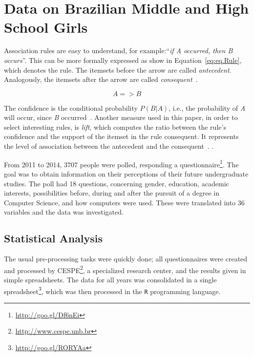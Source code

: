 \section{Data on Brazilian Middle and High School Girls}\label{sec:mining}%
Association rules are easy to understand, for example:``\emph{if A occurred, then B occurs}''. This can be more formally expressed as show in Equation~\ref{eq:eq.Rule}, which denotes the rule. The itemsets before the arrow are called \emph{antecedent}. Analogously, the itemsets after the arrow are called \emph{consequent}~\cite{Hastie2009}.

\begin{equation}
{A} => {B}
\label{eq:eq.Rule}%
\end{equation}

The confidence is the conditional probability $P(B|A)$, i.e., the probability of \emph{A} will occur, since \emph{B} occurred~\cite{Hastie2009}. Another measure used in this paper, in order to select interesting rules, is \emph{lift}, which computes the ratio between the rule's confidence and the support of the itemset in the rule consequent. It represents the level of association between the antecedent and the consequent~\cite{tan2006introduction}. .

From 2011 to 2014, 3707 people were polled, responding a questionnaire\footnote{\url{http://goo.gl/Df6nEi}}. The goal was to obtain information on their perceptions of their future undergraduate studies. The poll had 18 questions, concerning gender, education, academic interests, possibilities before, during and after the pursuit of a degree in Computer Science, and how computers were used. These were translated into 36 variables and the data was investigated.

\subsection{Statistical Analysis}\label{sec:mining:stat}%
The usual pre-processing tasks were quickly done; all questionnaires were created and processed by CESPE\footnote{\url{http://www.cespe.unb.br}}, a specialized research center, and the results given in simple spreadsheets. The data for all years was consolidated in a single spreadsheet\footnote{\url{http://goo.gl/RORYAa}}, which was then processed in the \texttt{R} programming language.

